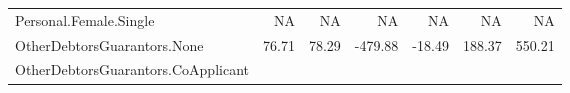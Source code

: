 \documentclass[]{article}
\begin{document}
\begin{longtable}[]{@{}lrrrrrr@{}}
\begin{minipage}[t]{0.31\columnwidth}\raggedright\strut
Personal.Female.Single\strut
\end{minipage} & \begin{minipage}[t]{0.10\columnwidth}\raggedleft\strut
NA\strut
\end{minipage} & \begin{minipage}[t]{0.08\columnwidth}\raggedleft\strut
NA\strut
\end{minipage} & \begin{minipage}[t]{0.08\columnwidth}\raggedleft\strut
NA\strut
\end{minipage} & \begin{minipage}[t]{0.08\columnwidth}\raggedleft\strut
NA\strut
\end{minipage} & \begin{minipage}[t]{0.08\columnwidth}\raggedleft\strut
NA\strut
\end{minipage} & \begin{minipage}[t]{0.08\columnwidth}\raggedleft\strut
NA\strut
\end{minipage}\tabularnewline
\begin{minipage}[t]{0.31\columnwidth}\raggedright\strut
OtherDebtorsGuarantors.None\strut
\end{minipage} & \begin{minipage}[t]{0.10\columnwidth}\raggedleft\strut
76.71\strut
\end{minipage} & \begin{minipage}[t]{0.08\columnwidth}\raggedleft\strut
78.29\strut
\end{minipage} & \begin{minipage}[t]{0.08\columnwidth}\raggedleft\strut
-479.88\strut
\end{minipage} & \begin{minipage}[t]{0.08\columnwidth}\raggedleft\strut
-18.49\strut
\end{minipage} & \begin{minipage}[t]{0.08\columnwidth}\raggedleft\strut
188.37\strut
\end{minipage} & \begin{minipage}[t]{0.08\columnwidth}\raggedleft\strut
550.21\strut
\end{minipage}\tabularnewline
\begin{minipage}[t]{0.31\columnwidth}\raggedright\strut
OtherDebtorsGuarantors.CoApplicant\strut
\end{minipage} & \begin{minipage}[t]{0.10\columnwidth}\raggedleft\strut

\end{minipage}
\end{longtable}
\end{document}
